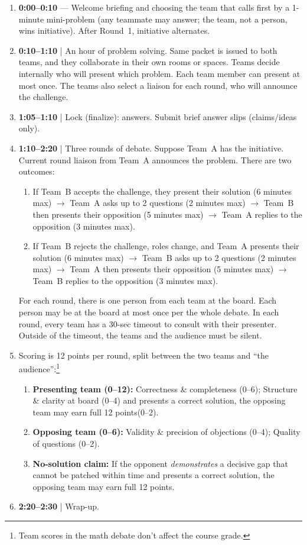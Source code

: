 \documentclass[oneside,11pt]{amsart}
\begin{document}
\begin{enumerate}[$\bullet$]
\item \textbf{0:00--0:10} --- Welcome briefing and choosing the 
team that calls first by
a
1-minute mini-problem (any teammate may answer; the team, not a person, wins initiative). After Round~1, initiative alternates.

\item \textbf{0:10--1:10} | An hour of problem solving. Same packet 
is issued to both teams, and they collaborate in their own rooms or spaces.
Teams decide internally who will present which problem. 
Each team member can present at most once.
The teams also select a liaison for each round, who will announce the challenge.

\item \textbf{1:05--1:10} | Lock (finalize): answers. Submit brief answer slips (claims/ideas only).

\item \textbf{1:10--2:20} |
Three rounds of debate.
Suppose Team~A has the initiative.
Current round liaison from Team~A
announces the problem.
There are two outcomes:
\begin{enumerate}
\item If Team~B accepts the challenge, they present their solution
(6 minutes max) $\to$
Team~A asks up to 2 questions (2 minutes max)
$\to$
Team~B then presents their opposition (5 minutes max)
$\to$
Team~A replies to the opposition (3 minutes max).
\item If Team~B rejects the challenge, roles change, and Team~A presents their solution (6 minutes max) $\to$
Team~B asks up to 2 questions (2 minutes max)
$\to$
Team~A then presents their opposition (5 minutes max)
$\to$
Team~B replies to the opposition (3 minutes max).
\end{enumerate}
For each round, there is one person from each team at the board. Each person
may be at the board at most once per the whole debate.
In each round, every team has a 30-sec timeout to consult with their presenter. Outside of the timeout, the teams and the audience must be silent.

\item Scoring is 12 points per round,
split between the two teams and ``the audience'':\footnote{Team scores 
in the math debate
don't affect the course grade.}
\begin{enumerate}
\item \textbf{Presenting team (0--12):} Correctness \& completeness (0--6); 
  Structure \& clarity at board (0--4) and presents a correct solution, the opposing team may earn full 12 points(0--2).
  \item \textbf{Opposing team (0--6):} Validity \& precision of objections (0--4);
  Quality of questions (0--2).
  \item \textbf{No-solution claim:} If the opponent \emph{demonstrates} a decisive gap that cannot be patched within time and presents a correct solution, the opposing team may earn full 12 points.
\end{enumerate}

\item \textbf{2:20--2:30} | Wrap-up.
\end{enumerate}
\end{document}
